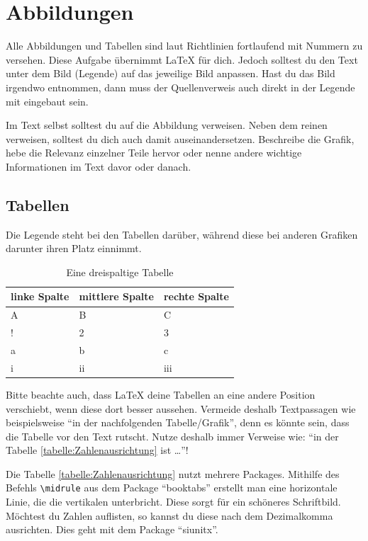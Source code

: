 \chapter{Abbildungen}
Alle Abbildungen und Tabellen sind laut Richtlinien fortlaufend mit Nummern zu versehen. Diese Aufgabe übernimmt \LaTeX{} für dich. Jedoch solltest du den Text unter dem Bild (Legende) auf das jeweilige Bild anpassen. Hast du das Bild irgendwo entnommen, dann muss der Quellenverweis auch direkt in der Legende mit eingebaut sein.

Im Text selbst solltest du auf die Abbildung verweisen. Neben dem reinen verweisen, solltest du dich auch damit auseinandersetzen. Beschreibe die Grafik, hebe die Relevanz einzelner Teile hervor oder nenne andere wichtige Informationen im Text davor oder danach.

\section{Tabellen}
Die Legende steht bei den Tabellen darüber, während diese bei anderen Grafiken darunter ihren Platz einnimmt.

\begin{table}[ht]
	\centering
	\caption{Eine dreispaltige Tabelle}
	\begin{tabular}{lll}
		\toprule
		\textbf{linke Spalte} & \textbf{mittlere Spalte} & \textbf{rechte Spalte} \\
		\midrule
		A & B & C \\
		! & 2 & 3 \\
		a & b & c \\
		i & ii & iii \\
		\bottomrule
	\end{tabular}
	\label{tabelle:Einfache3Spalten}
\end{table}

Bitte beachte auch, dass \LaTeX{} deine Tabellen an eine andere Position verschiebt, wenn diese dort besser aussehen. Vermeide deshalb Textpassagen wie beispielsweise \enquote{in der nachfolgenden Tabelle/Grafik}, denn es könnte sein, dass die Tabelle vor den Text rutscht. Nutze deshalb immer Verweise wie: \enquote{in der Tabelle \ref{tabelle:Zahlenausrichtung} ist \dots }!

Die Tabelle \ref{tabelle:Zahlenausrichtung} nutzt mehrere Packages. Mithilfe des Befehls \texttt{\textbackslash midrule} aus dem Package \enquote{booktabs} erstellt man eine horizontale Linie, die die vertikalen unterbricht. Diese sorgt für ein schöneres Schriftbild. Möchtest du Zahlen auflisten, so kannst du diese nach dem Dezimalkomma ausrichten. Dies geht mit dem Package \enquote{siunitx}.

